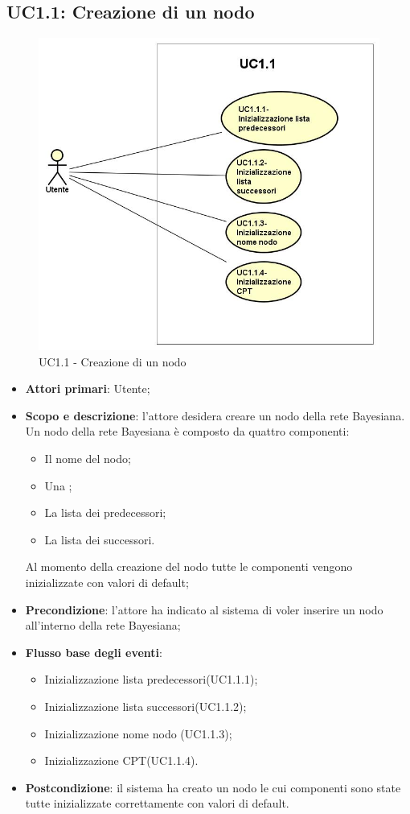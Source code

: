 \subsection{UC1.1: Creazione di un nodo}
\hypertarget{UC1.1}{}  
\begin{figure} [H]
	\centering
	\includegraphics[scale=0.45]{Img/UC1-1} 
	\caption{UC1.1 - Creazione di un nodo} \label{} 
\end{figure} 
\begin{itemize} 
	\item{\textbf{Attori primari}: Utente;} 
	\item{\textbf{Scopo e descrizione}: l'attore desidera creare un nodo della rete Bayesiana. Un nodo della rete Bayesiana è composto da quattro componenti: 
		\begin{itemize} 
			\item{Il nome del nodo;} 
			\item{Una ;} 
			\item{La lista dei predecessori;} 
			\item{La lista dei successori.} 
		\end{itemize} 
		Al momento della creazione del nodo tutte le componenti vengono inizializzate con valori di default;} 
	\item{\textbf{Precondizione}: l'attore ha indicato al sistema di voler inserire un nodo all'interno della rete Bayesiana;} 
	\item{\textbf{Flusso base degli eventi}: } 
	\begin{itemize} 
		\item{Inizializzazione lista predecessori(UC1.1.1);} 
		\item{Inizializzazione lista successori(UC1.1.2);} 
		\item{Inizializzazione nome nodo (UC1.1.3);} 
		\item{Inizializzazione CPT(UC1.1.4).} 
	\end{itemize} 
	\item{\textbf{Postcondizione}: il sistema ha creato un nodo le cui componenti sono state tutte inizializzate correttamente con valori di default.} 
\end{itemize} 
